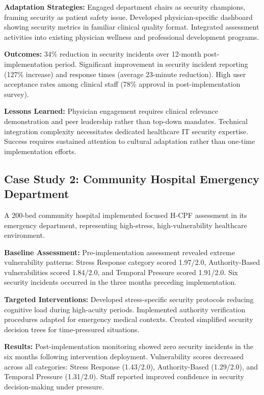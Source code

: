 \documentclass[10pt, twocolumn]{article}
\begin{document}
\textbf{Adaptation Strategies:} Engaged department chairs as security champions, framing security as patient safety issue. Developed physician-specific dashboard showing security metrics in familiar clinical quality format. Integrated assessment activities into existing physician wellness and professional development programs.

\textbf{Outcomes:} 34\% reduction in security incidents over 12-month post-implementation period. Significant improvement in security incident reporting (127\% increase) and response times (average 23-minute reduction). High user acceptance rates among clinical staff (78\% approval in post-implementation survey).

\textbf{Lessons Learned:} Physician engagement requires clinical relevance demonstration and peer leadership rather than top-down mandates. Technical integration complexity necessitates dedicated healthcare IT security expertise. Success requires sustained attention to cultural adaptation rather than one-time implementation efforts.

\subsection{Case Study 2: Community Hospital Emergency Department}

A 200-bed community hospital implemented focused H-CPF assessment in its emergency department, representing high-stress, high-vulnerability healthcare environment.

\textbf{Baseline Assessment:} Pre-implementation assessment revealed extreme vulnerability patterns: Stress Response category scored 1.97/2.0, Authority-Based vulnerabilities scored 1.84/2.0, and Temporal Pressure scored 1.91/2.0. Six security incidents occurred in the three months preceding implementation.

\textbf{Targeted Interventions:} Developed stress-specific security protocols reducing cognitive load during high-acuity periods. Implemented authority verification procedures adapted for emergency medical contexts. Created simplified security decision trees for time-pressured situations.

\textbf{Results:} Post-implementation monitoring showed zero security incidents in the six months following intervention deployment. Vulnerability scores decreased across all categories: Stress Response (1.43/2.0), Authority-Based (1.29/2.0), and Temporal Pressure (1.31/2.0). Staff reported improved confidence in security decision-making under pressure.
\end{document}
